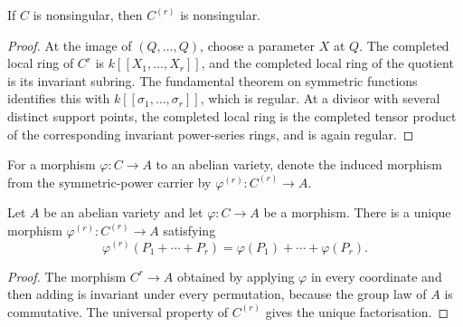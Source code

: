 \begin{lemma}
  \label{mk-lem:symmetric_power_nonsingular}

  If \(C\) is nonsingular, then \(C^{(r)}\) is nonsingular.
\end{lemma}

\begin{proof}
  At the image of \((Q,\ldots,Q)\), choose a parameter \(X\) at \(Q\).
  The completed local ring of \(C^r\) is
  \(k[[X_1,\ldots,X_r]]\), and the completed local ring of the quotient is
  its invariant subring.  The fundamental theorem on symmetric functions
  identifies this with
  \(k[[\sigma_1,\ldots,\sigma_r]]\), which is regular.  At a divisor with
  several distinct support points, the completed local ring is the
  completed tensor product of the corresponding invariant power-series
  rings, and is again regular.
\end{proof}

\begin{definition}
  \label{mk-def:symmetric_product_av_map}


  For a morphism \(\varphi\colon C\to A\) to an abelian variety, denote the
  induced morphism from the symmetric-power carrier by
  \(\varphi^{(r)}\colon C^{(r)}\to A\).
\end{definition}

\begin{lemma}
  \label{mk-lem:symmetric_product_av_map}

  Let \(A\) be an abelian variety and let \(\varphi\colon C\to A\) be a
  morphism.  There is a unique morphism
  \(\varphi^{(r)}\colon C^{(r)}\to A\) satisfying
  \[
    \varphi^{(r)}(P_1+\cdots+P_r)
      =\varphi(P_1)+\cdots+\varphi(P_r).
  \]
\end{lemma}

\begin{proof}
  The morphism \(C^r\to A\) obtained by applying \(\varphi\) in every
  coordinate and then adding is invariant under every permutation, because
  the group law of \(A\) is commutative.  The universal property of
  \(C^{(r)}\) gives the unique factorisation.
\end{proof}

